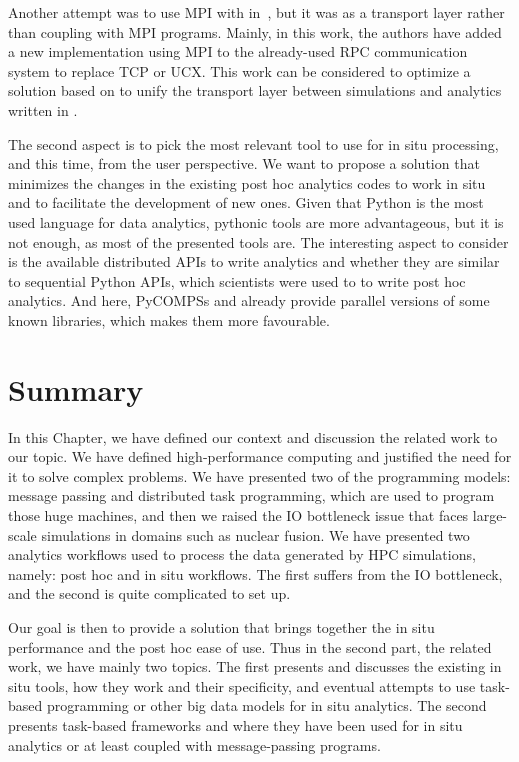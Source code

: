 Another attempt was to use MPI with \dask in~\cite{shafi_efficient_2021}, but it was as a transport layer rather than coupling with MPI programs. Mainly, in this work, the authors have added a new implementation using MPI to the already-used RPC communication system to replace TCP or UCX. This work can be considered to optimize a solution based on \dask to unify the transport layer between simulations and analytics written in \dask. 

The second aspect is to pick the most relevant tool to use for in situ processing, and this time, from the user perspective. 
We want to propose a solution that minimizes the changes in the existing post hoc analytics codes to work in situ and to facilitate the development of new ones.   
Given that Python is the most used language for data analytics, pythonic tools are more advantageous, but it is not enough, as most of the presented tools are. 
The interesting aspect to consider is the available distributed APIs to write analytics and whether they are similar to sequential Python APIs, which scientists were used to to write post hoc analytics. And here, PyCOMPSs and \dask already provide parallel versions of some known libraries, which makes them more favourable. 

\section{Summary}
In this Chapter, we have defined our context and discussion the related work to our topic.
We have defined high-performance computing and justified the need for it to solve complex problems. 
We have presented two of the programming models: message passing and distributed task programming, which are used to program those huge machines, and then we raised the IO bottleneck issue that faces large-scale simulations in domains such as nuclear fusion. 
We have presented two analytics workflows used to process the data generated by HPC simulations, namely: post hoc and in situ workflows. 
The first suffers from the IO bottleneck, and the second is quite complicated to set up.

Our goal is then to provide a solution that brings together the in situ performance and the post hoc ease of use. Thus in the second part, the related work, we have mainly two topics. 
The first presents and discusses the existing in situ tools, how they work and their specificity, and eventual attempts to use task-based programming or other big data models for in situ analytics. 
The second presents task-based frameworks and where they have been used for in situ analytics or at least coupled with message-passing programs. 


